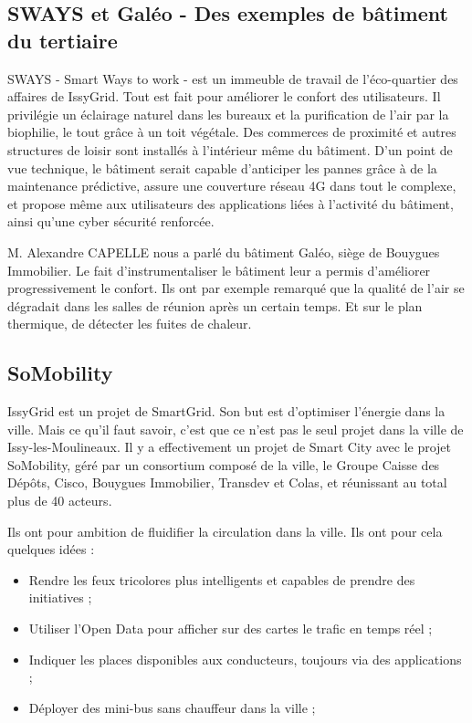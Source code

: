 \subsection{SWAYS et Galéo - Des exemples de bâtiment du tertiaire}
SWAYS - Smart Ways to work - est un immeuble de travail de l'éco-quartier des affaires de IssyGrid.
Tout est fait pour améliorer le confort des utilisateurs.
Il privilégie un éclairage naturel dans les bureaux et la purification de l'air par la biophilie,
le tout grâce à un toit végétale. Des commerces de proximité et autres structures de loisir
sont installés à l'intérieur même du bâtiment. D'un point de vue technique, le bâtiment serait
capable d'anticiper les pannes grâce à de la maintenance prédictive, assure une couverture réseau
4G dans tout le complexe, et propose même aux utilisateurs des applications liées à l'activité du
bâtiment, ainsi qu'une cyber sécurité renforcée.

M. Alexandre CAPELLE nous a parlé du bâtiment Galéo, siège de Bouygues Immobilier.
Le fait d'instrumentaliser le bâtiment leur a permis d'améliorer progressivement le confort.
Ils ont par exemple remarqué que la qualité de l'air se dégradait dans les salles de réunion après un certain temps.
Et sur le plan thermique, de détecter les fuites de chaleur.

\subsection{SoMobility}
IssyGrid est un projet de SmartGrid. Son but est d'optimiser l'énergie dans la ville.
Mais ce qu'il faut savoir, c'est que ce n'est pas le seul projet dans la ville de Issy-les-Moulineaux.
Il y a effectivement un projet de Smart City avec le projet SoMobility, géré par un consortium composé de
la ville, le Groupe Caisse des Dépôts, Cisco, Bouygues Immobilier, Transdev et Colas, et réunissant au total plus de 40 acteurs.

Ils ont pour ambition de fluidifier la circulation dans la ville.
Ils ont pour cela quelques idées :
\begin{itemize}
    \item Rendre les feux tricolores plus intelligents et capables de prendre des initiatives ;
    \item Utiliser l'Open Data pour afficher sur des cartes le trafic en temps réel ;
    \item Indiquer les places disponibles aux conducteurs, toujours via des applications ;
    \item Déployer des mini-bus sans chauffeur dans la ville ;
\end{itemize}

